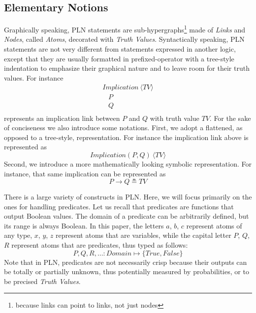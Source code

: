 \documentclass[runningheads]{llncs}
\newcommand{\SP}{\;\;\;}
\newcommand{\TTrue}{\textit{True}}
\newcommand{\TFalse}{\textit{False}}
\newcommand{\TAtom}{\textit{Atom}}
\newcommand{\TImpl}{\textit{Implication}}
\newcommand{\TTV}{\textit{TV}}
\newcommand{\TBTV}{\langle \TTV \rangle}
\newcommand{\limp}{\rightarrow}
\begin{document}
\subsection{Elementary Notions}


%
%
%


Graphically speaking, PLN statements are
sub-hypergraphs\footnote{because links can point to links, not just
  nodes} made of \emph{Links} and \emph{Nodes}, called \emph{Atoms},
decorated with \emph{Truth Values}.  Syntactically speaking, PLN
statements are not very different from statements expressed in another
logic, except that they are usually formatted in prefixed-operator
with a tree-style indentation to emphasize their graphical nature and
to leave room for their truth values.  For instance
$$
\begin{array}{l}
  \TImpl\ \TBTV\\
  \SP P\\
  \SP Q\\
\end{array}
$$
represents an implication link between $P$ and $Q$ with truth value
$\TTV$.  For the sake of conciseness we also introduce some notations.
First, we adopt a flattened, as opposed to a tree-style,
representation.  For instance the implication link above is
represented as
$$\TImpl(P, Q)\ \TBTV$$
Second, we introduce a more mathematically looking symbolic
representation.  For instance, that same implication can be
represented as
$$P \limp Q \measeq \TTV$$

There is a large variety of constructs in PLN.  Here, we will focus
primarily on the ones for handling predicates.  Let us recall that
predicates are functions that output Boolean values.  The domain of a
predicate can be arbitrarily defined, but its range is always Boolean.
In this paper, the letters $a$, $b$, $c$ represent atoms of
any type, $x$, $y$, $z$ represent atoms that are variables, while the
capital letter $P$, $Q$, $R$ represent atoms that are predicates, thus
typed as follows:
$$P, Q, R, \hdots: \textit{Domain} \mapsto \{\TTrue, \TFalse\}$$
Note that in PLN, predicates are not necessarily crisp because their
outputs can be totally or partially unknown, thus potentially measured
by probabilities, or to be precised \emph{Truth Values}.
\end{document}

